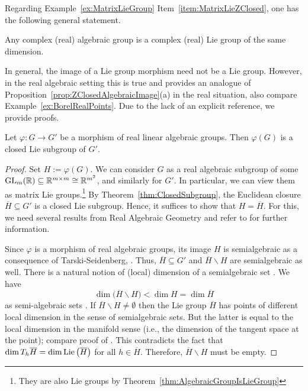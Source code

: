 Regarding Example~\ref{ex:MatrixLieGroup} Item~\ref{item:MatrixLieZClosed}, one has the following general statement.

\begin{theorem} \label{thm:AlgebraicGroupIsLieGroup}
	Any complex (real) algebraic group is a complex (real) Lie group of the same dimension.
\end{theorem}

In general, the image of a Lie group morphism need not be a Lie group. However, in the real algebraic setting this is true and provides an analogue of Proposition~\ref{prop:ZClosedAlgebraicImage}(a) in the real situation, also compare Example~\ref{ex:BorelRealPoints}.
Due to the lack of an explicit reference, we provide proofs.

\begin{prop}\label{prop:LieGroupImage}
	Let $\varphi \colon G \to G'$ be a morphism of real linear algebraic groups. Then $\varphi(G)$ is a closed Lie subgroup of $G'$.
\end{prop}

\begin{proof}
	Set $H := \varphi(G)$. We can consider $G$ as a real algebraic subgroup of some $\operatorname{GL}_m(\mathbb R) \subseteq \mathbb R^{m \times m} \cong \mathbb R^{m^2}$, and similarly for $G'$. In particular, we can view them as matrix Lie groups.\footnote{They are also Lie groups by Theorem~\ref{thm:AlgebraicGroupIsLieGroup}}
	By Theorem~\ref{thm:ClosedSubgroup}, the Euclidean closure $\overline{H} \subseteq G'$ is a closed Lie subgroup. Hence, it suffices to show that $H = \overline{H}$. For this, we need several results from Real Algebraic Geometry and refer to \cite{BochnakCosteRoy} for further information.
	
	Since $\varphi$ is a morphism of real algebraic groups, its image $H$ is semialgebraic as a consequence of Tarski-Seidenberg, \cite[Proposition~2.2.7]{BochnakCosteRoy}. Thus, $\overline{H} \subseteq G'$ and $\overline{H} \backslash H$ are semialgebraic as well. There is a natural notion of (local) dimension of a semialgebraic set \cite[Section~2.8]{BochnakCosteRoy}. We have 
		\[ \dim \big( \overline{H} \backslash H \big) < \dim H = \dim \overline{H} \]
	as semi-algebraic sets \cite[Propositions~2.8.2 and~2.8.13]{BochnakCosteRoy}. If $\overline{H} \backslash H \neq \emptyset$ then the Lie group $\overline{H}$ has points of different local dimension in the sense of semialgebraic sets. But the latter is equal to the local dimension in the manifold sense (i.e., the dimension of the tangent space at the point); compare proof of \cite[Proposition~2.8.14]{BochnakCosteRoy}. This contradicts the fact that $\dim T_h \overline{H} = \dim \operatorname{Lie} \big( \overline{H} \big)$ for all $h \in \overline{H}$. Therefore, $\overline{H} \backslash H$ must be empty.
\end{proof}

